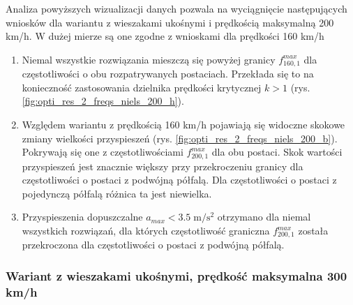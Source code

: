 Analiza powyższych wizualizacji danych pozwala na wyciągnięcie następujących wniosków dla wariantu z wieszakami ukośnymi i prędkością maksymalną 200 km/h. W dużej mierze są one zgodne z wnioskami dla prędkości 160 km/h
\begin{enumerate}

\item Niemal wszystkie rozwiązania mieszczą się powyżej granicy $f_{160,1}^{max}$ dla częstotliwości o obu rozpatrywanych postaciach. Przekłada się to na konieczność zastosowania dzielnika prędkości krytycznej $k>1$ (rys. \ref{fig:opti_res_2_freqs_niels_200_h}).

\item Względem wariantu z prędkością 160 km/h pojawiają się widoczne skokowe zmiany wielkości przyspieszeń (rys. \ref{fig:opti_res_2_freqs_niels_200_b}). Pokrywają się one z częstotliwościami $f_{200,1}^{max}$ dla obu postaci. Skok wartości przyspieszeń jest znacznie większy przy przekroczeniu granicy dla częstotliwości o postaci z podwójną półfalą. Dla częstotliwości o postaci z pojedynczą półfalą różnica ta jest niewielka.

\item Przyspieszenia dopuszczalne $a_{max}<3.5\;\mathrm{m/s^2}$ otrzymano dla niemal wszystkich rozwiązań, dla których częstotliwość graniczna $f_{200,1}^{max}$ została przekroczona dla częstotliwości o postaci z podwójną półfalą.

\end{enumerate}
\vfill


\subsubsection{Wariant z wieszakami ukośnymi, prędkość maksymalna 300 km/h}

